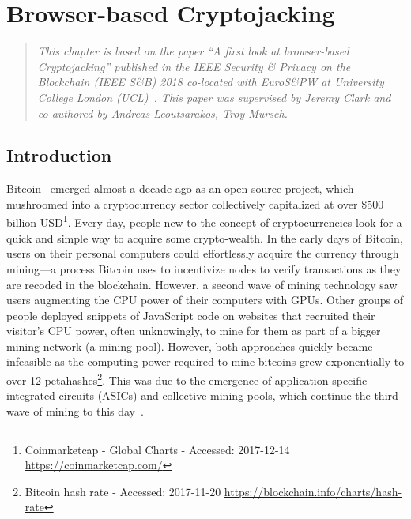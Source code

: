 

\chapter{Browser-based Cryptojacking}\label{sec:cryptojacking}

\begin{quote}
	\textit{This chapter is based on the paper ``A first look at browser-based Cryptojacking'' published in the IEEE Security \& Privacy on the Blockchain (IEEE S\&B) 2018 co-located with EuroS\&PW at University College London (UCL)~\cite{eskandari2018first}. This paper was supervised by Jeremy Clark and co-authored by Andreas Leoutsarakos, Troy Mursch.}
\end{quote}

\section{Introduction}

Bitcoin~\cite{nakamoto2008bitcoin} emerged almost a decade ago as an open source project, which mushroomed into a cryptocurrency sector collectively capitalized at over \$500 billion USD\footnote{Coinmarketcap - Global Charts - Accessed: 2017-12-14 \url{https://coinmarketcap.com/}}. Every day, people new to the concept of cryptocurrencies look for a quick and simple way to acquire some crypto-wealth. In the early days of Bitcoin, users on their personal computers could effortlessly acquire the currency through mining---a process Bitcoin uses to incentivize nodes to verify transactions as they are recoded in the blockchain. However, a second wave of mining technology saw users augmenting the CPU power of their computers with GPUs. Other groups of people deployed snippets of JavaScript code on websites that recruited their visitor's CPU power, often unknowingly, to mine for them as part of a bigger mining network (\ie a mining pool). However, both approaches quickly became infeasible as the computing power required to mine bitcoins grew exponentially to over 12 petahashes\footnote{Bitcoin hash rate - Accessed: 2017-11-20 \url{https://blockchain.info/charts/hash-rate}}. This was due to the emergence of application-specific integrated circuits (ASICs) and collective mining pools, which continue the third wave of mining to this day~\cite{narayanan2016}. 

